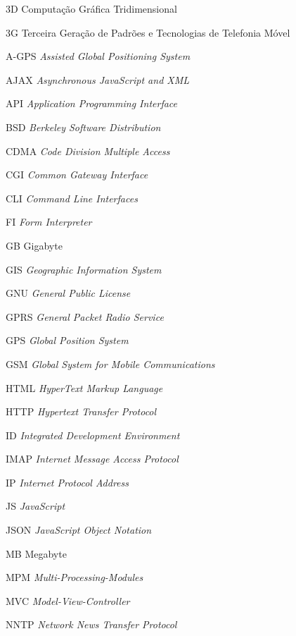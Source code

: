 
\begin{siglas}
    \item[3D] Computação Gráfica Tridimensional
    \item[3G] Terceira Geração de Padrões e Tecnologias de Telefonia Móvel
    \item[A-GPS] \textit{Assisted Global Positioning System}
    \item[AJAX] \textit{Asynchronous JavaScript and XML}
    \item[API] \textit{Application Programming Interface}
    \item[BSD] \textit{Berkeley Software Distribution}
    \item[CDMA] \textit{Code Division Multiple Access}
    \item[CGI] \textit{Common Gateway Interface}
    \item[CLI] \textit{Command Line Interfaces}
    \item[FI] \textit{Form Interpreter}
    \item[GB] Gigabyte
    \item[GIS] \textit{Geographic Information System}
    \item[GNU] \textit{General Public License}
    \item[GPRS] \textit{General Packet Radio Service}
    \item[GPS] \textit{Global Position System}
    \item[GSM] \textit{Global System for Mobile Communications}
    \item[HTML] \textit{HyperText Markup Language}
    \item[HTTP] \textit{Hypertext Transfer Protocol}
    \item[ID] \textit{Integrated Development Environment}
    \item[IMAP] \textit{Internet Message Access Protocol}
    \item[IP] \textit{Internet Protocol Address}
    \item[JS] \textit{JavaScript}
    \item[JSON] \textit{JavaScript Object Notation}
    \item[MB] Megabyte
    \item[MPM] \textit{Multi-Processing-Modules}
    \item[MVC] \textit{Model-View-Controller}
    \item[NNTP] \textit{Network News Transfer Protocol}

\end{siglas}
